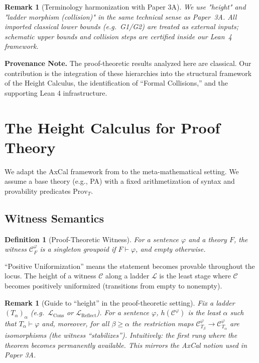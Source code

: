 \documentclass[11pt]{article}
\newtheorem{definition}[theorem]{Definition}
\newtheorem{remark}[theorem]{Remark}
\newcommand{\LCons}{\mathcal{L}_{\mathrm{Cons}}}
\newcommand{\LReflect}{\mathcal{L}_{\mathrm{Reflect}}}
\newcommand{\Prov}{\mathrm{Prov}}
\begin{document}
\begin{remark}[Terminology harmonization with Paper 3A]
We use "height" and "ladder morphism (collision)" in the same technical sense as Paper~3A.
All imported classical lower bounds (e.g.\ G1/G2) are treated as external inputs; schematic upper bounds
and collision steps are certified inside our Lean~4 framework.
\end{remark}

\begin{mdframed}[style=provenance]
\textbf{Provenance Note.} The proof-theoretic results analyzed here are classical. Our contribution is the integration of these hierarchies into the structural framework of the Height Calculus, the identification of ``Formal Collisions,'' and the supporting Lean 4 infrastructure.
\end{mdframed}

\section{The Height Calculus for Proof Theory}
We adapt the AxCal framework from \cite{Paper3a} to the meta-mathematical setting. We assume a base theory (e.g., PA) with a fixed arithmetization of syntax and provability predicates $\Prov_T$.

\subsection{Witness Semantics}
\begin{definition}[Proof-Theoretic Witness]
For a sentence $\varphi$ and a theory $F$, the witness $\mathcal C^\varphi_F$ is a singleton groupoid if $F\vdash \varphi$, and empty otherwise.
\end{definition}
``Positive Uniformization'' means the statement becomes provable throughout the locus. The height of a witness $\mathcal{C}$ along a ladder $\mathcal{L}$ is the least stage where $\mathcal{C}$ becomes positively uniformized (transitions from empty to nonempty).

\begin{remark}[Guide to ``height'' in the proof-theoretic setting]
Fix a ladder $(T_\alpha)_\alpha$ (e.g.\ $\LCons$ or $\LReflect$). For a sentence $\varphi$,
$h(\mathcal C^\varphi)$ is the least $\alpha$ such that $T_\alpha \vdash \varphi$ and, moreover,
for all $\beta\ge \alpha$ the restriction maps $\mathcal C^\varphi_{T_\beta}\to \mathcal C^\varphi_{T_\alpha}$
are isomorphisms (the witness ``stabilizes''). Intuitively: the first rung where the theorem becomes
permanently available. This mirrors the AxCal notion used in Paper 3A.
\end{remark}
\end{document}
